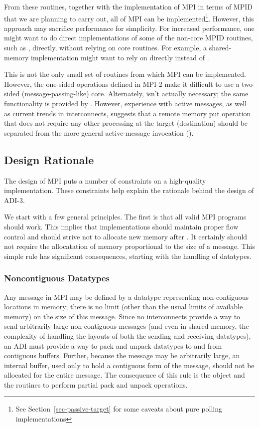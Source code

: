 \documentclass{article}
\begin{document}
From these routines, together with the implementation of MPI in terms of MPID
that we are planning to carry out, all of MPI can be implemented\footnote{See
Section~\ref{sec-passive-target} for some caveats about pure polling
implementations}.  However, this approach may sacrifice performance
for simplicity.  For increased performance, one might want to do direct
implementations of some of the non-core MPID routines, such as
, directly, without relying on core routines.  For example, a
shared-memory implementation might want to rely on  directly
instead of .

This is not the only small set of routines from which MPI can be
implemented.  However, the one-sided operations defined in MPI-2 make
it difficult to use a two-sided (message-passing-like) core.
Alternately,  isn't actually necessary; the same
functionality is provided by .  However, experience
with active messages, as well as current trends in interconnects,
suggests that a remote memory put operation that does not require any
other processing at the target (destination) should be separated from
the more general active-message invocation ().

\subsection{Design Rationale}
\label{sec-intermediate}
The design of MPI puts a number of constraints on a high-quality
implementation.  These constraints help explain the rationale behind
the design of ADI-3.

We start with a few general principles.  The first is that all valid
MPI programs should work.  This implies that implementations should
maintain proper flow control and should strive not to allocate new
memory after .  It certainly should not require
the allocatation of memory proportional to the size of a message.
This simple rule has significant consequences, starting with the
handling of datatypes.

\subsubsection{Noncontiguous Datatypes}
Any message in MPI may be defined by a datatype representing
non-contiguous locations in memory; there is no limit (other than the
usual limits of available memory) on the size of this message.  Since
no interconnects provide a way to send arbitrarily large
non-contiguous messages (and even in shared memory, the complexity of
handling the layouts of both the sending and receiving datatypes), an
ADI must provide a way to pack and unpack datatypes to and from
contiguous buffers.  
Further, because the message may be arbitrarily large, an internal
buffer,
used only to hold a contiguous form of the message, should
not be allocated for the entire message.
The consequence of this rule is the  object and the
routines to perform partial pack and unpack operations.
\end{document}
